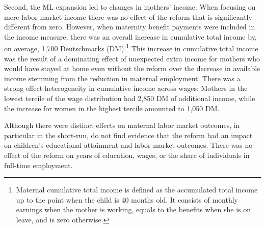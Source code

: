 \documentclass[11pt, a4paper, draft]{article} %
\begin{document}
Second, the ML expansion led to changes in mothers' income. When focusing on mere labor market income there was no effect of the reform that is significantly different from zero. However, when maternity benefit payments were included in the income measure, there was an overall increase in cumulative total income by, on average, 1,700 Deutschmarks (DM).\footnote{Maternal cumulative total income is defined as the accumulated total income up to the point when the child is 40 months old. It consists of monthly earnings when the mother is working, equals to the benefits when she is on leave, and is zero otherwise.} This increase in cumulative total income was the result of a dominating effect of unexpected extra income for mothers who would have stayed at home even without the reform over the decrease in available income stemming from the reduction in maternal employment. There was a strong effect heterogeneity in cumulative income across wages: Mothers in the lowest tercile of the wage distribution had 2,850 DM of additional income, while the increase for women in the highest tercile amounted to 1,050 DM. 


Although there were distinct effects on maternal labor market outcomes, in particular in the short-run, \cite{Dustmann2012} do not find evidence that the reform had an impact on children's educational attainment and labor market outcomes. There was no effect of the reform on years of education, wages, or the share of individuals in full-time employment.





 
\end{document}
